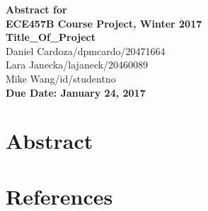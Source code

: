\documentclass[12pt]{article}
\begin{document}
\begin{center}
{\Large\bf Abstract for}\\
\vspace{1mm}
{\Large\bf ECE457B Course Project, Winter 2017}\\
\vspace{2mm}
{\Large\bf Title\_Of\_Project}\\
\vspace{4mm}
{Daniel Cardoza/dpmcardo/20471664}\\
{Lara Janecka/lajaneck/20460089}\\
{Mike Wang/id/studentno}\\
\vspace{2mm}
\textbf{Due Date: January 24, 2017}
\end{center}

\def\question#1{\item[\bf #1.]}
\def\part#1{\item[\bf #1)]}
\newcommand{\pc}[1]{\mbox{\textbf{#1}}} %

\section{Abstract}

\section{References}
\end{document}
